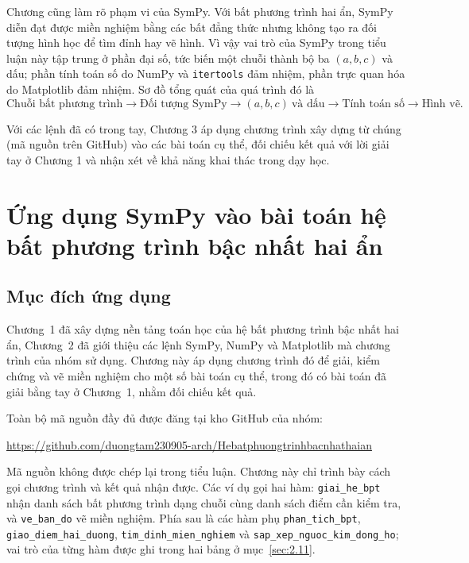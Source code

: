 \documentclass[12pt,a4paper]{report}
\begin{document}
Chương cũng làm rõ phạm vi của SymPy. Với bất phương trình hai ẩn, SymPy diễn đạt được miền nghiệm bằng các bất đẳng thức nhưng không tạo ra đối tượng hình học để tìm đỉnh hay vẽ hình. Vì vậy vai trò của SymPy trong tiểu luận này tập trung ở phần đại số, tức biến một chuỗi thành bộ ba $(a,b,c)$ và dấu; phần tính toán số do NumPy và \texttt{itertools} đảm nhiệm, phần trực quan hóa do Matplotlib đảm nhiệm. Sơ đồ tổng quát của quá trình đó là
\[
\text{Chuỗi bất phương trình}
\rightarrow
\text{Đối tượng SymPy}
\rightarrow
(a,b,c)\ \text{và dấu}
\rightarrow
\text{Tính toán số}
\rightarrow
\text{Hình vẽ}.
\]

Với các lệnh đã có trong tay, Chương 3 áp dụng chương trình xây dựng từ chúng (mã nguồn trên GitHub) vào các bài toán cụ thể, đối chiếu kết quả với lời giải tay ở Chương 1 và nhận xét về khả năng khai thác trong dạy học.


\chapter{Ứng dụng SymPy vào bài toán hệ bất phương trình bậc nhất hai ẩn}
\label{chuong3}

\section{Mục đích ứng dụng}
\label{sec:3.1}

Chương~1 đã xây dựng nền tảng toán học của hệ bất phương trình bậc nhất hai ẩn, Chương~2 đã giới thiệu các lệnh SymPy, NumPy và Matplotlib mà chương trình của nhóm sử dụng. Chương này áp dụng chương trình đó để giải, kiểm chứng và vẽ miền nghiệm cho một số bài toán cụ thể, trong đó có bài toán đã giải bằng tay ở Chương~1, nhằm đối chiếu kết quả.

Toàn bộ mã nguồn đầy đủ được đăng tại kho GitHub của nhóm:
\begin{center}
\url{https://github.com/duongtam230905-arch/Hebatphuongtrinhbacnhathaian}
\end{center}

Mã nguồn không được chép lại trong tiểu luận. Chương này chỉ trình bày cách gọi chương trình và kết quả nhận được. Các ví dụ gọi hai hàm: \texttt{giai\_he\_bpt} nhận danh sách bất phương trình dạng chuỗi cùng danh sách điểm cần kiểm tra, và \texttt{ve\_ban\_do} vẽ miền nghiệm. Phía sau là các hàm phụ \texttt{phan\_tich\_bpt}, \texttt{giao\_diem\_hai\_duong}, \texttt{tim\_dinh\_mien\_nghiem} và \texttt{sap\_xep\_nguoc\_kim\_dong\_ho}; vai trò của từng hàm được ghi trong hai bảng ở mục~\ref{sec:2.11}.
\end{document}
